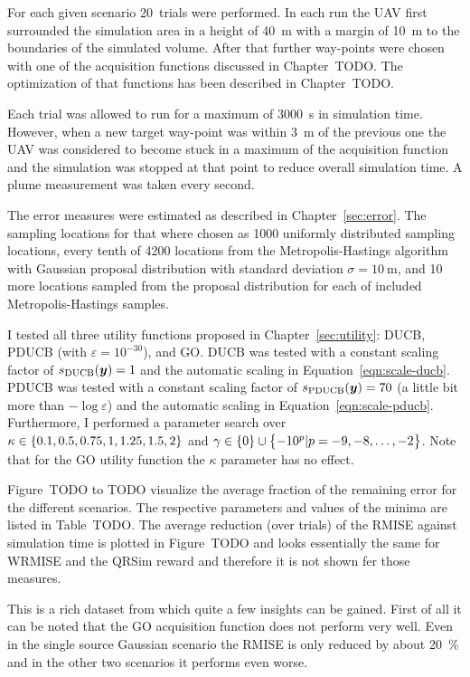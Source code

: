 For each given scenario 20~trials were performed. In each run the UAV first 
surrounded the simulation area in a height of \SI{40}{\meter} with a margin of 
\SI{10}{\meter} to the boundaries of the simulated volume. After that further 
way-points were chosen with one of the acquisition functions discussed in 
Chapter~TODO\@. The optimization of that functions has been described in 
Chapter~TODO\@.

Each trial was allowed to run for a maximum of \SI{3000}{\second} in simulation 
time. However, when a new target way-point was within \SI{3}{\meter} of the 
previous one the UAV was considered to become stuck in a maximum of the 
acquisition function and the simulation was stopped at that point to reduce 
overall simulation time. A plume measurement was taken every second.

The error measures were estimated as described in Chapter~\ref{sec:error}. The 
sampling locations for that where chosen as 1000 uniformly distributed sampling 
locations, every tenth of 4200 locations from the Metropolis-Hastings algorithm 
with Gaussian proposal distribution with standard deviation $\sigma 
= \SI{10}{\meter}$, and 10 more locations sampled from the proposal distribution 
for each of included Metropolis-Hastings samples.

I tested all three utility functions proposed in Chapter~\ref{sec:utility}: 
DUCB, PDUCB (with $\varepsilon = 10^{-30}$), and GO\@. DUCB was tested with 
a constant scaling factor of $s_{\mathrm{DUCB}}(\bm{y}) = 1$ and the automatic scaling 
in Equation~\ref{eqn:scale-ducb}.  PDUCB was tested with a constant scaling 
factor of $s_{\mathrm{PDUCB}}(\bm{y}) = 70$ (a little bit more than $-\log 
\varepsilon$) and the automatic scaling in Equation~\ref{eqn:scale-pducb}.  
Furthermore, I performed a parameter search over $\kappa \in \cbr{0.1, 0.5, 
0.75, 1, 1.25, 1.5, 2}$ and $\gamma \in \cbr{0} \cup \cbr{-10^p | p = -9, -8, 
  \dots, -2}$. Note that for the GO utility function the $\kappa$ parameter has 
no effect.

Figure~TODO to TODO visualize the average fraction of the remaining error for 
the different scenarios. The respective parameters and values of the minima are 
listed in Table~TODO\@. The average reduction (over trials) of the RMISE against 
simulation time is plotted in Figure~TODO and looks essentially the same for 
WRMISE and the QRSim reward and therefore it is not shown fer those measures.

This is a rich dataset from which quite a few insights can be gained. First of 
all it can be noted that the GO acquisition function does not perform very well.  
Even in the single source Gaussian scenario the RMISE is only reduced by about 
\SI{20}{\percent} and in the other two scenarios it performs even worse.

